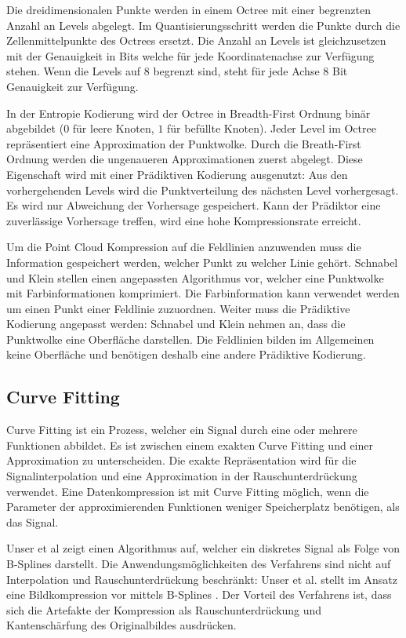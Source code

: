 Die dreidimensionalen Punkte werden in einem Octree mit einer begrenzten Anzahl an Levels abgelegt. Im Quantisierungsschritt werden die Punkte durch die Zellenmittelpunkte des Octrees ersetzt. Die Anzahl an Levels ist gleichzusetzen mit der Genauigkeit in Bits welche für jede Koordinatenachse zur Verfügung stehen. Wenn die Levels auf $8$ begrenzt sind, steht für jede Achse $8$ Bit Genauigkeit zur Verfügung.

In der Entropie Kodierung wird der Octree in Breadth-First Ordnung binär abgebildet ($0$ für leere Knoten, $1$ für befüllte Knoten). Jeder Level im Octree repräsentiert eine Approximation der Punktwolke. Durch  die Breath-First Ordnung werden die ungenaueren Approximationen zuerst abgelegt. Diese Eigenschaft wird mit einer Prädiktiven Kodierung ausgenutzt: Aus den vorhergehenden Levels wird die Punktverteilung des nächsten Level vorhergesagt. Es wird nur Abweichung der Vorhersage gespeichert. Kann der Prädiktor eine zuverlässige Vorhersage treffen, wird eine hohe Kompressionsrate erreicht.

Um die Point Cloud Kompression auf die Feldlinien anzuwenden muss die Information gespeichert werden, welcher Punkt zu welcher Linie gehört. Schnabel und Klein stellen einen angepassten Algorithmus vor, welcher eine Punktwolke mit Farbinformationen komprimiert. Die Farbinformation kann verwendet werden um einen Punkt einer Feldlinie zuzuordnen. Weiter muss die Prädiktive Kodierung angepasst werden: Schnabel und Klein nehmen an, dass die Punktwolke eine Oberfläche darstellen. Die Feldlinien bilden im Allgemeinen keine Oberfläche und benötigen deshalb eine andere Prädiktive Kodierung.

\subsection{Curve Fitting}
Curve Fitting ist ein Prozess, welcher ein Signal durch eine oder mehrere Funktionen abbildet. Es ist zwischen einem exakten Curve Fitting und einer Approximation zu unterscheiden. Die exakte Repräsentation wird für die Signalinterpolation und eine Approximation in der Rauschunterdrückung verwendet. Eine Datenkompression ist mit Curve Fitting möglich, wenn die Parameter der approximierenden Funktionen weniger Speicherplatz benötigen, als das Signal.

Unser et al \cite{unser1993b:spline} zeigt einen Algorithmus auf, welcher ein diskretes Signal als Folge von B-Splines darstellt. Die Anwendungsmöglichkeiten des Verfahrens sind nicht auf Interpolation und Rauschunterdrückung beschränkt: Unser et al. stellt im Ansatz eine Bildkompression vor mittels B-Splines \cite{unser1993b2:spline}. Der Vorteil des Verfahrens ist, dass sich die Artefakte der Kompression als Rauschunterdrückung und Kantenschärfung des Originalbildes ausdrücken.


